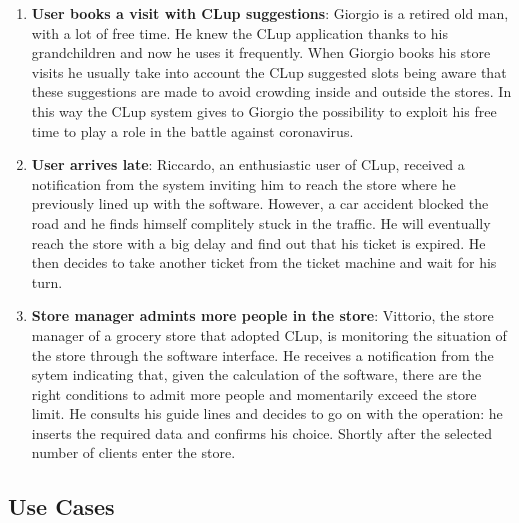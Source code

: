 \documentclass[]{article}
\begin{document}
\begin{enumerate}
					\item \textbf{User books a visit with CLup suggestions}: \newline
					Giorgio is a retired old man, with a lot of free time. He knew the CLup application thanks to his grandchildren and now he uses it frequently. When Giorgio books his store visits he usually take into account the CLup suggested slots being aware that these suggestions are made to avoid crowding inside and outside the stores. 
					\newline In this way the CLup system gives to Giorgio the possibility to exploit his free time to play a role in the battle against coronavirus.
		
		
					\item \textbf{User arrives late}: \newline
						Riccardo, an enthusiastic user of CLup, received a notification from the system inviting him to reach the store where he previously lined up with the software. \newline
		However, a car accident blocked the road and he finds himself complitely stuck in the traffic. He will eventually reach the store with a big delay and find out that his ticket is expired. \newline He then decides to take another ticket from the ticket machine and wait for his turn. \newline
					\item \textbf{Store manager admints more people in the store}: \newline
						Vittorio, the store manager of a grocery store that adopted CLup, is monitoring the situation of the store through the software interface. \newline
		He receives a notification from the sytem indicating that, given the calculation of the software, there are the right conditions to admit more people and momentarily exceed the store limit. \newline
		He consults his guide lines and decides to go on with the operation: he inserts the required data and confirms his choice. \newline
		Shortly after the selected number of clients enter the store. \newline\newline
						\end{enumerate}
		




		\subsection{Use Cases}
		
\end{document}
